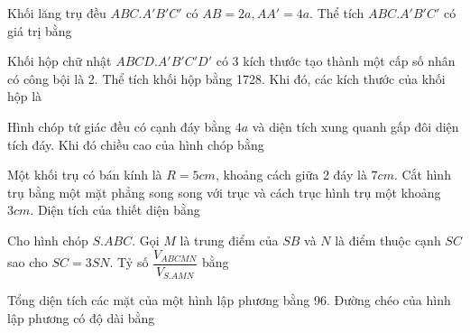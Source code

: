 \begin{question}%
Khối lăng trụ đều $ABC.A'B'C'$ có $AB=2a, AA'=4a$. Thể tích $ABC.A'B'C'$ có giá trị bằng
\vspace{0.2cm}
\datcot
\bonpa
{}
{}
{}
{}
\end{question}

\begin{question} %
Khối hộp chữ nhật $ABCD.A'B'C'D'$ có 3 kích thước tạo thành một cấp số nhân có công bội là 2. Thể tích khối hộp bằng 1728. Khi đó, các kích thước của khối hộp là
\vspace{0.2cm}
\datcot
\bonpa
{}
{}
{}
{}
\end{question}

\begin{question}%
Hình chóp tứ giác đều có cạnh đáy bằng $4a$ và diện tích xung quanh gấp đôi diện tích đáy. Khi đó chiều cao của hình chóp bằng
\vspace{0.2cm}
\datcot
\bonpa
{}
{}
{}
{}
\end{question}

\begin{question}%
Một khối trụ có bán kính là $R=5cm$, khoảng cách giữa 2 đáy là $7cm$. Cắt hình trụ bằng một mặt phẳng song song với trục và cách trục hình trụ một khoảng $3cm$. Diện tích của thiết diện bằng
\vspace{0.2cm}
\datcot
\bonpa
{}
{}
{}
{}
\end{question}

\begin{question}%
Cho hình chóp $S.ABC$. Gọi $M$ là trung điểm của $SB$ và $N$ là điểm thuộc cạnh $SC$ sao cho $SC=3SN$. Tỷ số $\dfrac{V_{ABCMN}}{V_{S.AMN}}$ bằng
\vspace{0.2cm}
\datcot
\bonpa
{}
{}
{}
{}
\end{question}

\begin{question}%
Tổng diện tích các mặt của một hình lập phương bằng 96. Đường chéo của hình lập phương có độ dài bằng
\vspace{0.2cm}
\datcot
\bonpa
{}
{}
{}
{}
\end{question}

